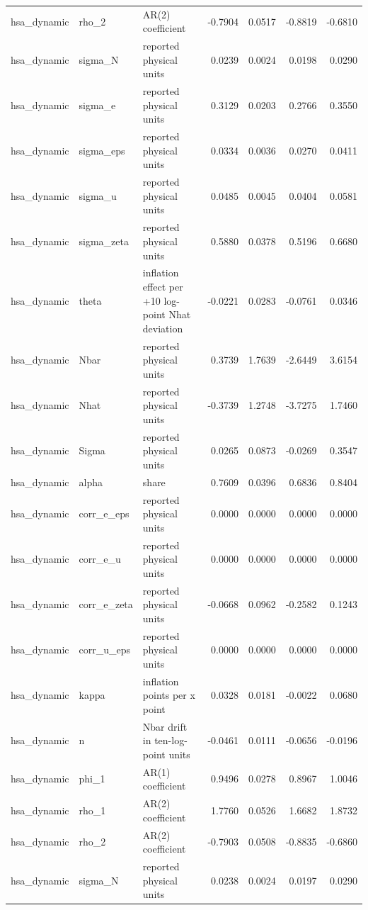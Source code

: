 \begin{tabular}{lllrrrr}
hsa\_dynamic & rho\_2 & AR(2) coefficient & -0.7904 & 0.0517 & -0.8819 & -0.6810 \\
hsa\_dynamic & sigma\_N & reported physical units & 0.0239 & 0.0024 & 0.0198 & 0.0290 \\
hsa\_dynamic & sigma\_e & reported physical units & 0.3129 & 0.0203 & 0.2766 & 0.3550 \\
hsa\_dynamic & sigma\_eps & reported physical units & 0.0334 & 0.0036 & 0.0270 & 0.0411 \\
hsa\_dynamic & sigma\_u & reported physical units & 0.0485 & 0.0045 & 0.0404 & 0.0581 \\
hsa\_dynamic & sigma\_zeta & reported physical units & 0.5880 & 0.0378 & 0.5196 & 0.6680 \\
hsa\_dynamic & theta & inflation effect per +10 log-point Nhat deviation & -0.0221 & 0.0283 & -0.0761 & 0.0346 \\
hsa\_dynamic & Nbar & reported physical units & 0.3739 & 1.7639 & -2.6449 & 3.6154 \\
hsa\_dynamic & Nhat & reported physical units & -0.3739 & 1.2748 & -3.7275 & 1.7460 \\
hsa\_dynamic & Sigma & reported physical units & 0.0265 & 0.0873 & -0.0269 & 0.3547 \\
hsa\_dynamic & alpha & share & 0.7609 & 0.0396 & 0.6836 & 0.8404 \\
hsa\_dynamic & corr\_e\_eps & reported physical units & 0.0000 & 0.0000 & 0.0000 & 0.0000 \\
hsa\_dynamic & corr\_e\_u & reported physical units & 0.0000 & 0.0000 & 0.0000 & 0.0000 \\
hsa\_dynamic & corr\_e\_zeta & reported physical units & -0.0668 & 0.0962 & -0.2582 & 0.1243 \\
hsa\_dynamic & corr\_u\_eps & reported physical units & 0.0000 & 0.0000 & 0.0000 & 0.0000 \\
hsa\_dynamic & kappa & inflation points per x point & 0.0328 & 0.0181 & -0.0022 & 0.0680 \\
hsa\_dynamic & n & Nbar drift in ten-log-point units & -0.0461 & 0.0111 & -0.0656 & -0.0196 \\
hsa\_dynamic & phi\_1 & AR(1) coefficient & 0.9496 & 0.0278 & 0.8967 & 1.0046 \\
hsa\_dynamic & rho\_1 & AR(2) coefficient & 1.7760 & 0.0526 & 1.6682 & 1.8732 \\
hsa\_dynamic & rho\_2 & AR(2) coefficient & -0.7903 & 0.0508 & -0.8835 & -0.6860 \\
hsa\_dynamic & sigma\_N & reported physical units & 0.0238 & 0.0024 & 0.0197 & 0.0290 \\

\end{tabular}
